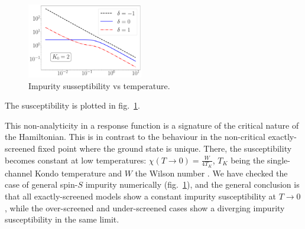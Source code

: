 \documentclass[reprint,prb,superscriptaddress]{revtex4-2}
\begin{document}
\begin{figure}[!htpb]
\centering
\includegraphics[width=0.45\textwidth]{plt/Central_Field_Chi_Powerlaw_}
\caption{Impurity susseptibility vs temperature.}
\label{fig:suseptibility_impurity}
\end{figure}
The susceptibility is plotted in fig.~\ref{fig:suseptibility_impurity}.

This non-analyticity in a response function is a signature of the critical nature of the Hamiltonian. This is in contrast to the behaviour in the non-critical exactly-screened fixed point where the ground state is unique. There, the susceptibility becomes constant at low temperatures: \(\chi(T\to 0) = \frac{W}{4 T_K}\), \(T_K\) being the single-channel Kondo temperature and \(W\) the Wilson number \cite{wilson1975renormalization,nozieres1974fermi,bullaNRGreview,kondo_urg}. We have checked the case of general spin-\(S\) impurity numerically (fig.~\ref{fig:suseptibility_impurity}), and the general conclusion is that all exactly-screened models show a constant impurity susceptibility at \(T \to 0\), while the over-screened and under-screened cases show a diverging impurity susceptibility in the same limit. 
\end{document}
